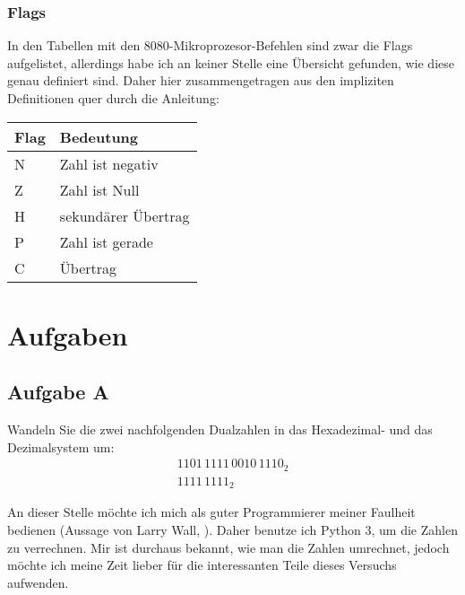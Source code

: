 \subsubsection{Flags}

In den Tabellen mit den 8080-Mikroprozesor-Befehlen sind zwar die Flags
aufgelistet, allerdings habe ich an keiner Stelle eine Übersicht gefunden, wie
diese genau definiert sind. Daher hier zusammengetragen aus den impliziten
Definitionen quer durch die Anleitung:

\begin{tabular}{ll}
	Flag & Bedeutung \\
	\hline
	N & Zahl ist negativ \\
	Z & Zahl ist Null \\
	H & sekundärer Übertrag \cite[Abschnitt~„Flags“]{wikipedia/8080} \\
	P & Zahl ist gerade \\
	C & Übertrag \\
\end{tabular}


\FloatBarrier
\section{Aufgaben}

\subsection{Aufgabe A}

\begin{problem}
	Wandeln Sie die zwei nachfolgenden Dualzahlen in das Hexadezimal- und das
	Dezimalsystem um:
	\begin{gather*}
		1101\,1111\,0010\,1110_2 \\
		1111\,1111_2
	\end{gather*}
\end{problem}

An dieser Stelle möchte ich mich als guter Programmierer meiner Faulheit
bedienen (Aussage von Larry Wall, \cite{threevirtues.com}). Daher benutze ich
Python 3, um die Zahlen zu verrechnen. Mir ist durchaus bekannt, wie man die
Zahlen umrechnet, jedoch möchte ich meine Zeit lieber für die interessanten
Teile dieses Versuchs aufwenden.

